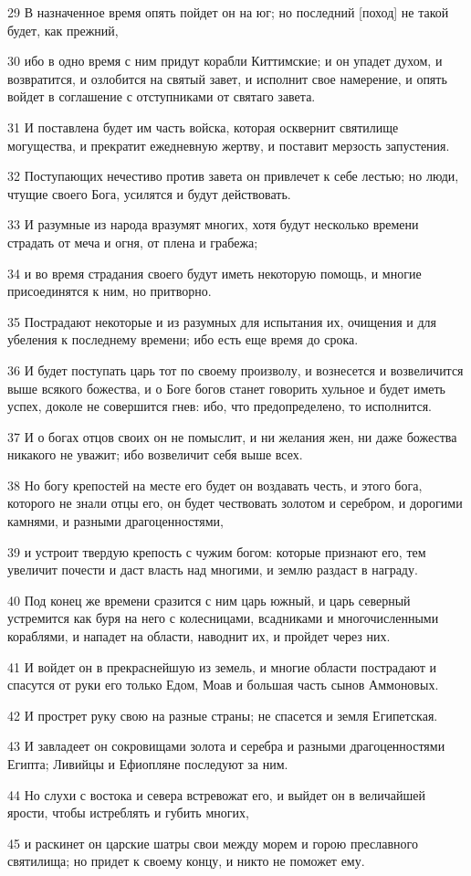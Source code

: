 \par 29 В назначенное время опять пойдет он на юг; но последний [поход] не такой будет, как прежний,
\par 30 ибо в одно время с ним придут корабли Киттимские; и он упадет духом, и возвратится, и озлобится на святый завет, и исполнит свое намерение, и опять войдет в соглашение с отступниками от святаго завета.
\par 31 И поставлена будет им часть войска, которая осквернит святилище могущества, и прекратит ежедневную жертву, и поставит мерзость запустения.
\par 32 Поступающих нечестиво против завета он привлечет к себе лестью; но люди, чтущие своего Бога, усилятся и будут действовать.
\par 33 И разумные из народа вразумят многих, хотя будут несколько времени страдать от меча и огня, от плена и грабежа;
\par 34 и во время страдания своего будут иметь некоторую помощь, и многие присоединятся к ним, но притворно.
\par 35 Пострадают некоторые и из разумных для испытания их, очищения и для убеления к последнему времени; ибо есть еще время до срока.
\par 36 И будет поступать царь тот по своему произволу, и вознесется и возвеличится выше всякого божества, и о Боге богов станет говорить хульное и будет иметь успех, доколе не совершится гнев: ибо, что предопределено, то исполнится.
\par 37 И о богах отцов своих он не помыслит, и ни желания жен, ни даже божества никакого не уважит; ибо возвеличит себя выше всех.
\par 38 Но богу крепостей на месте его будет он воздавать честь, и этого бога, которого не знали отцы его, он будет чествовать золотом и серебром, и дорогими камнями, и разными драгоценностями,
\par 39 и устроит твердую крепость с чужим богом: которые признают его, тем увеличит почести и даст власть над многими, и землю раздаст в награду.
\par 40 Под конец же времени сразится с ним царь южный, и царь северный устремится как буря на него с колесницами, всадниками и многочисленными кораблями, и нападет на области, наводнит их, и пройдет через них.
\par 41 И войдет он в прекраснейшую из земель, и многие области пострадают и спасутся от руки его только Едом, Моав и большая часть сынов Аммоновых.
\par 42 И прострет руку свою на разные страны; не спасется и земля Египетская.
\par 43 И завладеет он сокровищами золота и серебра и разными драгоценностями Египта; Ливийцы и Ефиопляне последуют за ним.
\par 44 Но слухи с востока и севера встревожат его, и выйдет он в величайшей ярости, чтобы истреблять и губить многих,
\par 45 и раскинет он царские шатры свои между морем и горою преславного святилища; но придет к своему концу, и никто не поможет ему.

